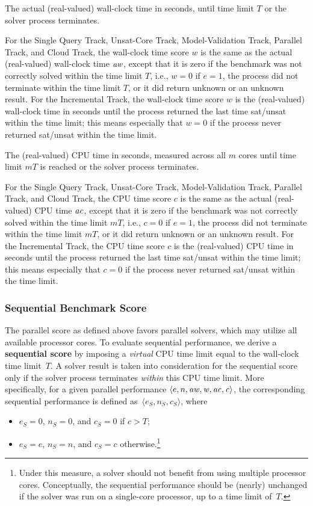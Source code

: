 \documentclass[12pt]{article}
\newcommand{\maintrack}{Single Query Track\xspace}
\newcommand{\inctrack}{Incremental Track\xspace}
\newcommand{\ucoretrack}{Unsat-Core Track\xspace}
\newcommand{\mvaltrack}{Model-Validation Track\xspace}
\newcommand{\paralleltrack}{Parallel Track\xspace}
\newcommand{\cloudtrack}{Cloud Track\xspace}
\begin{document}
The actual (real-valued) wall-clock time in seconds, until time limit $T$ or the
solver process terminates.

For the \maintrack, \ucoretrack, \mvaltrack, \paralleltrack, and
\cloudtrack, the wall-clock time score $w$ is the same as 
the actual (real-valued) wall-clock time $\it{aw}$, 
except that it is zero if the benchmark was not correctly solved within the time limit $T$, i.e., 
$w = 0$ if $e = 1$, the process did not terminate within the time limit $T$, or 
it did return unknown or an unknown result.
For the \inctrack, the wall-clock time score $w$ 
is the (real-valued) wall-clock time in seconds until the process returned the last time sat/unsat within the time limit;
this means especially that $w = 0$ if the process never returned sat/unsat within the time limit.

The (real-valued) CPU time in seconds, measured across all $m$ cores
until time limit $mT$ is reached or the solver process
terminates.

For the \maintrack, \ucoretrack, \mvaltrack, \paralleltrack, and
\cloudtrack, the CPU time score $c$ is the same as 
the actual (real-valued) CPU time $\it{ac}$, 
except that it is zero if the benchmark was not correctly solved within the time limit $mT$, i.e., 
$c = 0$ if $e = 1$, the process did not terminate within the time limit $mT$, or 
it did return unknown or an unknown result.
For the \inctrack, the CPU time score $c$ 
is the (real-valued) CPU time in seconds until the process returned the last time sat/unsat within the time limit;
this means especially that $c = 0$ if the process never returned sat/unsat within the time limit.

\subsubsection{Sequential Benchmark Score}
\label{sec:sequential}

The parallel score as defined above favors parallel solvers, which may utilize
all available processor cores.  To evaluate sequential performance, we derive a
\textbf{sequential score} by imposing a \emph{virtual} CPU time limit equal to
the wall-clock time limit~$T$.  A solver result is taken into consideration for
the sequential score only if the solver process terminates \emph{within} this
CPU time limit.  More specifically, for a given parallel performance $\langle
e, n, \it{aw}, w, \it{ac}, c\rangle$, the corresponding sequential performance is defined
as~$\langle e_S, n_S, c_S\rangle$, where
\begin{itemize}
\item $e_S = 0$, $n_S = 0$, and $c_S = 0$ if $c > T$;
\item $e_S = e$, $n_S = n$, and $c_S = c$
  otherwise.\footnote{Under this
  measure, a solver should not benefit from using multiple processor
  cores.  Conceptually, the sequential performance should be (nearly)
  unchanged if the solver was run on a single-core processor, up to a
  time limit of~$T$.}
\end{itemize}
\end{document}
